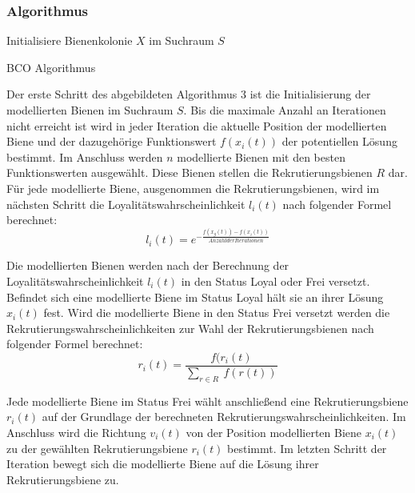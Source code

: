 \documentclass[a4paper, 11pt]{article}
\begin{document}
\subsubsection{Algorithmus}
\begin{framed}
	\begin{algorithm}[H]
		Initialisiere Bienenkolonie $X$ im Suchraum $S$\;
		\caption{\acs{BCO} Algorithmus}
		\label{bcoalgo}
	\end{algorithm}
\end{framed}
Der erste Schritt des abgebildeten Algorithmus 3 ist die Initialisierung der modellierten Bienen im Suchraum $S$. Bis die maximale Anzahl an Iterationen nicht erreicht ist wird in jeder Iteration die aktuelle Position der modellierten Biene und der dazugehörige Funktionswert $f(x_{i}(t))$ der potentiellen Lösung bestimmt. Im Anschluss werden $n$ modellierte Bienen mit den besten Funktionswerten ausgewählt. Diese Bienen stellen die Rekrutierungsbienen $R$ dar. Für jede modellierte Biene, ausgenommen die Rekrutierungsbienen, wird im nächsten Schritt die Loyalitätswahrscheinlichkeit $l_{i}(t)$ nach folgender Formel berechnet:
\begin{equation}
l_{i}(t) = e^{-\frac{f(x_{g}(t))-f(x_{i}(t))}{Anzahl der Iterationen}}
\end{equation}
\par Die modellierten Bienen werden nach der Berechnung der Loyalitätswahrscheinlichkeit $l_{i}(t)$ in den Status Loyal oder Frei versetzt. Befindet sich eine modellierte Biene im Status Loyal hält sie an ihrer Lösung $x_{i}(t)$ fest. Wird die modellierte Biene in den Status Frei versetzt werden die Rekrutierungswahrscheinlichkeiten zur Wahl der Rekrutierungsbienen nach folgender Formel berechnet:
\begin{equation}
r_{i}(t) = \frac{f(r_{i}(t)}{\sum_{r \in R}\ f(r(t))}
\end{equation}
\par Jede modellierte Biene im Status Frei wählt anschließend eine Rekrutierungsbiene $r_{i}(t)$ auf der Grundlage der berechneten Rekrutierungswahrscheinlichkeiten. Im Anschluss wird die Richtung $v_{i}(t)$ von der Position modellierten Biene $x_{i}(t)$ zu der gewählten Rekrutierungsbiene $r_{i}(t)$ bestimmt. Im letzten Schritt der Iteration bewegt sich die modellierte Biene auf die Lösung ihrer Rekrutierungsbiene zu.
\newpage
\end{document}
